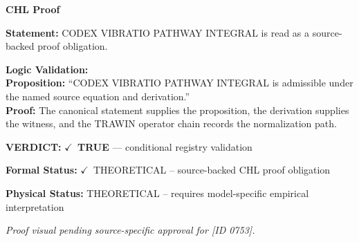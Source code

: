 \vspace{0.45em}
\noindent\textbf{CHL Proof}\par
\textbf{Statement:} CODEX VIBRATIO PATHWAY INTEGRAL is read as a source-backed proof obligation.

\textbf{Logic Validation:}\\
\textbf{Proposition:} ``CODEX VIBRATIO PATHWAY INTEGRAL is admissible under the named source equation and derivation.''\\
\textbf{Proof:} The canonical statement supplies the proposition, the derivation supplies the witness, and the TRAWIN operator chain records the normalization path.

\textbf{VERDICT:} \ensuremath{\checkmark}\ \textbf{TRUE} --- conditional registry validation

\textbf{Formal Status:} \ensuremath{\checkmark}\ THEORETICAL -- source-backed CHL proof obligation

\textbf{Physical Status:} THEORETICAL -- requires model-specific empirical interpretation
\par\vspace{0.45em}
\par
\vfill
\begingroup\footnotesize\itshape
Proof visual pending source-specific approval for [ID 0753].
\par\endgroup
\vfill
\endgroup
\endgroup
